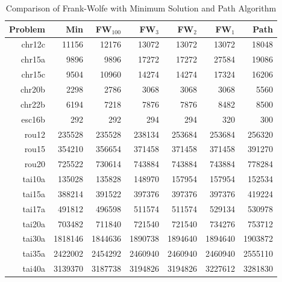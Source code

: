 \documentclass{amsart}
\theoremstyle{plain} \newtheorem{Exa}{Example}[section]
\begin{document}
\begin{table}[htdp]
\caption{Comparison of Frank-Wolfe with Minimum Solution and Path Algorithm}
\begin{center}
\begin{tabular}{|r|r||r|r|r|r|r|}
\hline
Problem  &   Min    & FW$_{100}$&FW$_{3}$&FW$_{2}$&FW$_{1}$&Path\\
\hline
    chr12c &   11156 &   12176 &   13072 &   13072 &   13072 &   18048\\
    chr15a &    9896 &    9896 &   17272 &   17272 &   27584 &   19086\\
    chr15c &    9504 &   10960 &   14274 &   14274 &   17324 &   16206\\
    chr20b &    2298 &    2786 &    3068 &    3068 &    3068 &    5560\\
    chr22b &    6194 &    7218 &    7876 &    7876 &    8482 &    8500\\
    esc16b &     292 &     292 &     294 &     294 &     320 &     300\\
     rou12 &  235528 &  235528 &  238134 &  253684 &  253684 &  256320\\
     rou15 &  354210 &  356654 &  371458 &  371458 &  371458 &  391270\\
     rou20 &  725522 &  730614 &  743884 &  743884 &  743884 &  778284\\
    tai10a &  135028 &  135828 &  148970 &  157954 &  157954 &  152534\\
    tai15a &  388214 &  391522 &  397376 &  397376 &  397376 &  419224\\
    tai17a &  491812 &  496598 &  511574 &  511574 &  529134 &  530978\\
    tai20a &  703482 &  711840 &  721540 &  721540 &  734276 &  753712\\
    tai30a & 1818146 & 1844636 & 1890738 & 1894640 & 1894640 & 1903872\\
    tai35a & 2422002 & 2454292 & 2460940 & 2460940 & 2460940 & 2555110\\
    tai40a & 3139370 & 3187738 & 3194826 & 3194826 & 3227612 & 3281830\\
    \hline
\end{tabular}
\end{center}
\label{tab:fwpath}
\end{table}%


\end{document}

